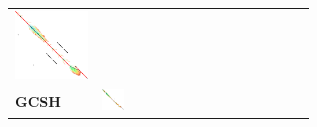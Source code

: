 \begin{figure}[H]
\begin{tabular}{l>{\centering}m{0.12\linewidth}>{\centering}m{0.12\linewidth}>{\centering}m{0.12\linewidth}>{\centering\arraybackslash}m{0.35\linewidth}}
    \includegraphics[scale=0.09]{imgs/comparison/csh-dt.png} \\[1cm]
    \textbf{GCSH} &
    \includegraphics[scale=0.09]{imgs/comparison/gcsh-noprune.png} &

\end{tabular}
\end{figure}
